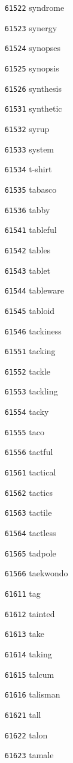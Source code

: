 \documentclass[twoside,11pt]{article}
\begin{document}
\begin{multicols}{5}
\begin{enumerate}
\item[\texttt{61522}] syndrome
\item[\texttt{61523}] synergy
\item[\texttt{61524}] synopses
\item[\texttt{61525}] synopsis
\item[\texttt{61526}] synthesis
\item[\texttt{61531}] synthetic
\item[\texttt{61532}] syrup
\item[\texttt{61533}] system
\item[\texttt{61534}] t-shirt
\item[\texttt{61535}] tabasco
\item[\texttt{61536}] tabby
\item[\texttt{61541}] tableful
\item[\texttt{61542}] tables
\item[\texttt{61543}] tablet
\item[\texttt{61544}] tableware
\item[\texttt{61545}] tabloid
\item[\texttt{61546}] tackiness
\item[\texttt{61551}] tacking
\item[\texttt{61552}] tackle
\item[\texttt{61553}] tackling
\item[\texttt{61554}] tacky
\item[\texttt{61555}] taco
\item[\texttt{61556}] tactful
\item[\texttt{61561}] tactical
\item[\texttt{61562}] tactics
\item[\texttt{61563}] tactile
\item[\texttt{61564}] tactless
\item[\texttt{61565}] tadpole
\item[\texttt{61566}] taekwondo
\item[\texttt{61611}] tag
\item[\texttt{61612}] tainted
\item[\texttt{61613}] take
\item[\texttt{61614}] taking
\item[\texttt{61615}] talcum
\item[\texttt{61616}] talisman
\item[\texttt{61621}] tall
\item[\texttt{61622}] talon
\item[\texttt{61623}] tamale

\end{enumerate}
\end{multicols}
\end{document}
